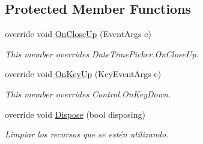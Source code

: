 \subsection*{Protected Member Functions}
\begin{DoxyCompactItemize}
\item 
override void \hyperlink{class_custom_controls_1_1_nullable_date_time_picker_abae021db5f6f9836f2b010ce0d962076}{On\+Close\+Up} (Event\+Args e)
\begin{DoxyCompactList}\small\item\em This member overrides Date\+Time\+Picker.\+On\+Close\+Up. \end{DoxyCompactList}\item 
override void \hyperlink{class_custom_controls_1_1_nullable_date_time_picker_a56546974d2a84d7a88065eff1e5bc25e}{On\+Key\+Up} (Key\+Event\+Args e)
\begin{DoxyCompactList}\small\item\em This member overrides Control.\+On\+Key\+Down. \end{DoxyCompactList}\item 
override void \hyperlink{class_custom_controls_1_1_nullable_date_time_picker_aa8f2112f0653075b0405e3ef6ddafa0b}{Dispose} (bool disposing)
\begin{DoxyCompactList}\small\item\em Limpiar los recursos que se estén utilizando. \end{DoxyCompactList}\end{DoxyCompactItemize}
